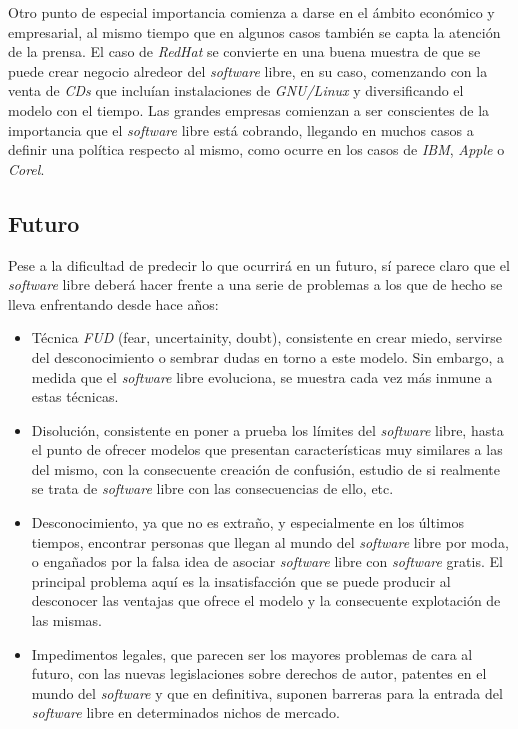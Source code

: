 Otro punto de especial importancia comienza a darse en el ámbito económico y
empresarial, al mismo tiempo que en algunos casos también se capta la atención
de la prensa. El caso de \textit{RedHat} se convierte en una buena muestra de
que se puede crear negocio alredeor del \textit{software} libre, en su caso,
comenzando con la venta de \textit{CDs} que incluían instalaciones de
\textit{GNU/Linux} y diversificando el modelo con el tiempo. Las grandes
empresas comienzan a ser conscientes de la importancia que el \textit{software}
libre está cobrando, llegando en muchos casos a definir una política respecto al
mismo, como ocurre en los casos de \textit{IBM}, \textit{Apple} o
\textit{Corel}.

\subsection{Futuro}

Pese a la dificultad de predecir lo que ocurrirá en un futuro, sí parece claro
que el \textit{software} libre deberá hacer frente a una serie de problemas a
los que de hecho se lleva enfrentando desde hace años:

\begin{itemize}
  \item Técnica \textit{FUD} (fear, uncertainity, doubt), consistente en crear
miedo, servirse del desconocimiento o sembrar dudas en torno a este modelo. Sin
embargo, a medida que el \textit{software} libre evoluciona, se muestra cada vez
más inmune a estas técnicas.
  \item Disolución, consistente en poner a prueba los límites del
\textit{software} libre, hasta el punto de ofrecer modelos que presentan
características muy similares a las del mismo, con la consecuente creación de
confusión, estudio de si realmente se trata de \textit{software} libre con las
consecuencias de ello, etc.
  \item Desconocimiento, ya que no es extraño, y especialmente en los últimos
tiempos, encontrar personas que llegan al mundo del \textit{software} libre por
moda, o engañados por la falsa idea de asociar \textit{software} libre con
\textit{software} gratis. El principal problema aquí es la insatisfacción que se
puede producir al desconocer las ventajas que ofrece el modelo y la consecuente
explotación de las mismas.
  \item Impedimentos legales, que parecen ser los mayores problemas de cara al
futuro, con las nuevas legislaciones sobre derechos de autor, patentes en el
mundo del \textit{software} y que en definitiva, suponen barreras para la
entrada del \textit{software} libre en determinados nichos de mercado.
\end{itemize}

